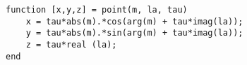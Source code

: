 \begin{verbatim}
function [x,y,z] = point(m, la, tau)
    x = tau*abs(m).*cos(arg(m) + tau*imag(la));
    y = tau*abs(m).*sin(arg(m) + tau*imag(la));
    z = tau*real (la);
end
\end{verbatim}
